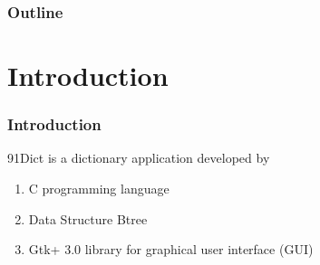 
\begin{frame}[t,plain]
  \titlepage
\end{frame}


\begin{frame}
\frametitle{Outline} %
  \tableofcontents %
\end{frame}


\section{Introduction} %


\begin{frame}
\frametitle{Introduction}
  91Dict is a dictionary application developed by
  \begin{enumerate}[1.]
    \item C programming language
    \item Data Structure Btree 
    \item Gtk+ 3.0 library for graphical user interface (GUI)
  \end{enumerate}
\end{frame}

